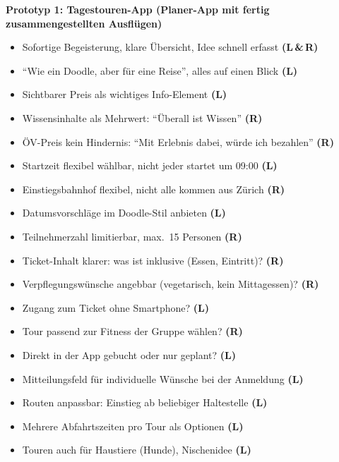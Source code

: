 \newpage
\begin{center}\textbf{Prototyp 1: Tagestouren-App (Planer-App mit fertig zusammengestellten Ausflügen)}\end{center}
\FeedbackGrid
{%
\begin{itemize}[nosep,leftmargin=1.3em]
  \item Sofortige Begeisterung, klare Übersicht, Idee schnell erfasst \textbf{(L\,\&\,R)}
  \item \enquote{Wie ein Doodle, aber für eine Reise}, alles auf einen Blick \textbf{(L)}
  \item Sichtbarer Preis als wichtiges Info-Element \textbf{(L)}
  \item Wissensinhalte als Mehrwert: \enquote{Überall ist Wissen} \textbf{(R)}
  \item ÖV-Preis kein Hindernis: \enquote{Mit Erlebnis dabei, würde ich bezahlen} \textbf{(R)}
\end{itemize}}
{%
\begin{itemize}[nosep,leftmargin=1.3em]
  \item Startzeit flexibel wählbar, nicht jeder startet um 09:00 \textbf{(L)}
  \item Einstiegsbahnhof flexibel, nicht alle kommen aus Zürich \textbf{(R)}
  \item Datumsvorschläge im Doodle-Stil anbieten \textbf{(L)}
  \item Teilnehmerzahl limitierbar, max.~15 Personen \textbf{(R)}
  \item Ticket-Inhalt klarer: was ist inklusive (Essen, Eintritt)? \textbf{(R)}
\end{itemize}}
{%
\begin{itemize}[nosep,leftmargin=1.3em]
  \item Verpflegungswünsche angebbar (vegetarisch, kein Mittagessen)? \textbf{(R)}
  \item Zugang zum Ticket ohne Smartphone? \textbf{(L)}
  \item Tour passend zur Fitness der Gruppe wählen? \textbf{(R)}
  \item Direkt in der App gebucht oder nur geplant? \textbf{(L)}
\end{itemize}}
{%
\begin{itemize}[nosep,leftmargin=1.3em]
  \item Mitteilungsfeld für individuelle Wünsche bei der Anmeldung \textbf{(L)}
  \item Routen anpassbar: Einstieg ab beliebiger Haltestelle \textbf{(L)}
  \item Mehrere Abfahrtszeiten pro Tour als Optionen \textbf{(L)}
  \item Touren auch für Haustiere (Hunde), Nischenidee \textbf{(L)}
\end{itemize}}

